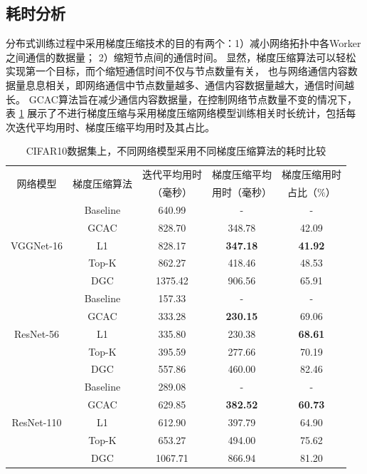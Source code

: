 \documentclass{xdupgthesis}
\begin{document}
\subsection{耗时分析}
分布式训练过程中采用梯度压缩技术的目的有两个：1）减小网络拓扑中各Worker之间通信的数据量；
2）缩短节点间的通信时间。
显然，梯度压缩算法可以轻松实现第一个目标，而个缩短通信时间不仅与节点数量有关，
也与网络通信内容数据量息息相关，即网络通信中节点数量越多、通信内容数据量越大，通信时间越长。
GCAC算法旨在减少通信内容数据量，在控制网络节点数量不变的情况下，
表 \ref{tab_Result-time-contrast} 展示了不进行梯度压缩与采用梯度压缩网络模型训练相关时长统计，包括每次迭代平均用时、梯度压缩平均用时及其占比。

\renewcommand{\arraystretch}{1.3}
\begin{table}[ht]
    \centering
    \begin{threeparttable}
        \caption{CIFAR10数据集上，不同网络模型采用不同梯度压缩算法的耗时比较}
        \label{tab_Result-time-contrast}
        \begin{tabular}{c|c|c|c|c}
            \toprule
            \toprule
            \multirow{2}{*}{网络模型} & \multirow{2}{*}{梯度压缩算法} & 迭代平均用时 & 梯度压缩平均 & 梯度压缩用时 \\
            & & （毫秒） & 用时（毫秒）& 占比（$\%$） \\
            \midrule
            \multirow{5}{*}{VGGNet-16} & Baseline & 640.99 & - & - \\
                  & GCAC & 828.70 & 348.78 & 42.09 \\
                  & L1 & 828.17 & \textbf{347.18} & \textbf{41.92} \\
                  & Top-K & 862.27 & 418.46 & 48.53 \\
                  & DGC & 1375.42 & 906.56 & 65.91 \\
            \midrule
            \multirow{5}{*}{ResNet-56} & Baseline & 157.33 & - & - \\
                  & GCAC & 333.28 & \textbf{230.15} & 69.06 \\
                  & L1 & 335.80 & 230.38 & \textbf{68.61} \\
                  & Top-K & 395.59 & 277.66 & 70.19 \\
                  & DGC & 557.86 & 460.00 & 82.46 \\
            \midrule
            \multirow{5}{*}{ResNet-110} & Baseline & 289.08 & - & - \\
                  & GCAC & 629.85 & \textbf{382.52} & \textbf{60.73} \\
                  & L1 & 612.90 & 397.79 & 64.90 \\
                  & Top-K & 653.27 & 494.00 & 75.62 \\
                  & DGC & 1067.71 & 866.94 & 81.20 \\
            \bottomrule
            \bottomrule
        \end{tabular}
    \end{threeparttable}
\end{table}
\end{document}
